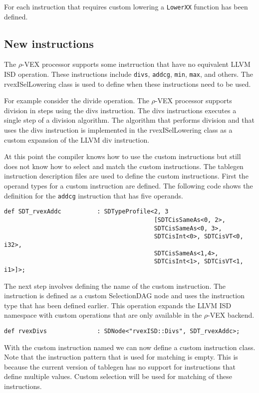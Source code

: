 For each instruction that requires custom lowering a \texttt{LowerXX} function has been defined.

\subsection{New instructions}
The $\rho$-VEX processor supports some instrruction that have no equivalent LLVM ISD operation. These instructions include \texttt{divs}, \texttt{addcg}, \texttt{min}, \texttt{max}, and others. The rvexISelLowering class is used to define when these instructions need to be used.

For example consider the divide operation. The $\rho$-VEX processor supports division in steps using the divs instruction. The divs instructions executes a single step of a division algorithm. The algorithm that performs division and that uses the divs instruction is implemented in the rvexISelLowering class as a custom expansion of the LLVM div instruction.

At this point the compiler knows how to use the custom instructions but still does not know how to select and match the custom instructions. The tablegen instruction description files are used to define the custom instructions. First the operand types for a custom instruction are defined. The following code shows the definition for the \texttt{addcg} instruction that has five operands. 

\begin{lstlisting}
def SDT_rvexAddc          : SDTypeProfile<2, 3
                                          [SDTCisSameAs<0, 2>,
                                          SDTCisSameAs<0, 3>,
                                          SDTCisInt<0>, SDTCisVT<0, i32>,
                                          SDTCisSameAs<1,4>,
                                          SDTCisInt<1>, SDTCisVT<1, i1>]>;
\end{lstlisting}

The next step involves defining the name of the custom instruction. The instruction is defined as a custom SelectionDAG node and uses the instruction type that has been defined earlier. This operation expands the LLVM ISD namespace with custom operations that are only available in the $\rho$-VEX backend.

\begin{lstlisting}
def rvexDivs              : SDNode<"rvexISD::Divs", SDT_rvexAddc>;
\end{lstlisting}

With the custom instruction named we can now define a custom instruction class. Note that the instruction pattern that is used for matching is empty. This is because the current version of tablegen has no support for instructions that define multiple values. Custom selection will be used for matching of these instructions.

